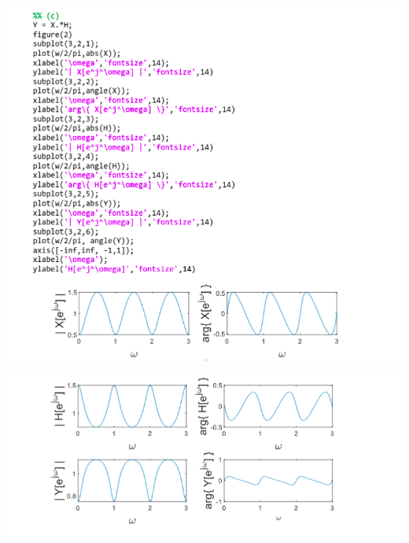 \documentclass[a4paper]{article}
\begin{document}
	
	\begin{center}
		\includegraphics[width=1\linewidth]{screenshot036}
	\end{center}
	\begin{center}
		\includegraphics[width=1\linewidth]{screenshot037}
	\end{center}
	
\end{document}
